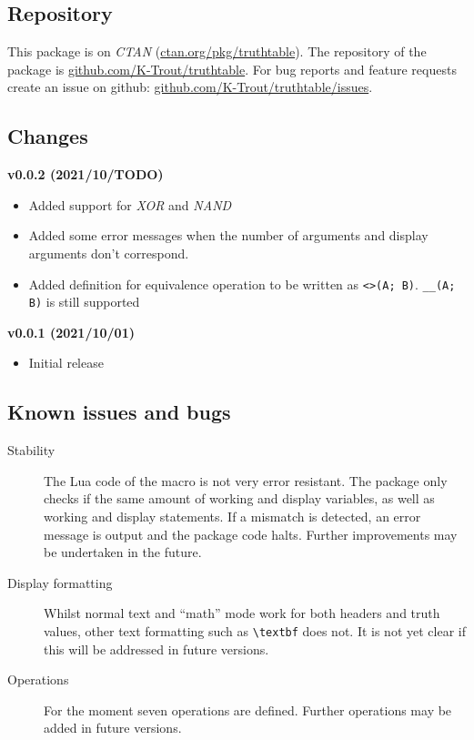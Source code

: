 \documentclass[a4paper]{article}
\begin{document}
\subsection{Repository}

This package is on \emph{CTAN} (\href{https://ctan.org/pkg/truthtable}{ctan.org/pkg/truthtable}). The repository of the package is \href{https://github.com/K-Trout/truthtable}{github.com/K-Trout/truthtable}. For bug reports and feature requests create an issue on github: \href{https://github.com/K-Trout/truthtable/issues}{github.com/K-Trout/truthtable/issues}.

\subsection{Changes}

\textbf{v0.0.2 (2021/10/TODO)}

\begin{itemize}
	\item Added support for \emph{XOR} and \emph{NAND}
	\item Added some error messages when the number of arguments and display arguments don't correspond.
	\item Added definition for equivalence operation to be written as \texttt{<>(A; B)}.  \texttt{\_\_(A; B)} is still supported
\end{itemize}
\textbf{v0.0.1 (2021/10/01)}

\begin{itemize}
	\item Initial release
\end{itemize}

\subsection{Known issues and bugs}

\begin{description}
	\item[Stability] The Lua code of the macro is not very error resistant. The package only checks if the same amount of working and display variables, as well as working and display statements. If a mismatch is detected, an error message is output and the package code halts. Further improvements may be undertaken in the future.
	\item[Display formatting] Whilst normal text and ``math'' mode work for both headers and truth values, other text formatting such as \texttt{\textbackslash textbf} does not. It is not yet clear if this will be addressed in future versions.
	\item[Operations] For the moment seven operations are defined. Further operations may be added in future versions.
\end{description}
\end{document}
